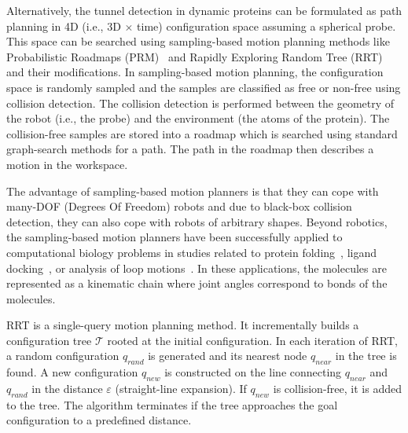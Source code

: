 \documentclass[usletter, 10pt, conference]{svjour3}      %
\def\qrand{q_{rand}}
\def\qnear{q_{near}}
\def\qnew{q_{new}}
\def\T{\mathcal{T}}
\begin{document}
Alternatively, the tunnel detection in dynamic proteins can be formulated as path planning in 4D (i.e., 3D $\times$ time) configuration space assuming a spherical probe.
This space can be searched using sampling-based motion planning methods like Probabilistic Roadmaps (PRM)~\cite{kavrakiPRM} and Rapidly Exploring Random Tree (RRT)~\cite{lavalleRRT} and their modifications.
In sampling-based motion planning, the configuration space is randomly sampled and the samples are classified as free or non-free using collision detection.
The collision detection is performed between the geometry of the robot (i.e., the probe) and the environment (the atoms of the protein).
The collision-free samples are stored into a roadmap which is searched using standard graph-search methods for a path.
The path in the roadmap then describes a motion in the workspace.

The advantage of sampling-based motion planners is that they can cope with many-DOF (Degrees Of Freedom) robots and due to black-box collision detection, they can also cope with robots of arbitrary shapes.
Beyond robotics, the sampling-based motion planners have been successfully applied to computational biology problems in studies related to protein folding~\cite{bayazit2001ligand,al2012motion,cortes2010simulating,amato2002using,raveh2009rapid,novinskaya2015improving,songPFintro,kirillova2008an}, ligand docking~\cite{cortes2010simulating,latombe1999motion,mollProt}, or analysis of loop motions~\cite{cortes2004geometric}.
In these applications, the molecules are represented as a kinematic chain where joint angles correspond to bonds of the molecules.

RRT is a single-query motion planning method.
It incrementally builds a configuration tree $\T$ rooted at the initial configuration.
In each iteration of RRT, a random configuration $\qrand$ is generated and its nearest node $\qnear$ in the tree  is found.
A new configuration $\qnew$ is constructed on the line connecting $\qnear$ and $\qrand$ in the distance $\varepsilon$ (straight-line expansion).
If $\qnew$ is collision-free, it is added to the tree.
The algorithm terminates if the tree approaches the goal configuration to a predefined distance.
\end{document}
